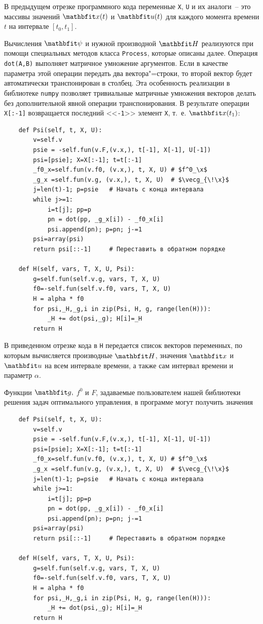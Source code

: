 \documentclass[a4paper,14pt, openany, twoside, draft]{extbook} %
\begin{document}
В предыдущем отрезке программного кода переменные \texttt{X}, \texttt{U} и их аналоги~-- это массивы значений $\vecx(t)$ и $\vecu(t)$ для каждого момента времени $t$ на интервале $[t_0,t_1]$.

Вычисления $\vecpsi$ и нужной производной $\vecH$ реализуются при помощи специальных методов класса \texttt{Process}, которые описаны далее.  Операция \texttt{dot(A,B)} выполняет матричное умножение аргументов.  Если в качестве параметра этой операции передать два вектора"=строки, то второй вектор будет автоматически транспонирован в столбец.  Эта особенность реализации в библиотеке \texttt{numpy} позволяет тривиальные матричные умножения векторов делать без дополнительной явной операции транспонирования.  В результате операции \texttt{X[:-1]} возвращается последний <<\texttt{-1}>> элемент \texttt{X}, т.~е. $\x(t_1)$:

\begin{verbatim}
    def Psi(self, t, X, U):
        v=self.v
        psie = -self.fun(v.F,(v.x,), t[-1], X[-1], U[-1])
        psi=[psie]; X=X[:-1]; t=t[:-1]
        _f0_x=self.fun(v.f0, (v.x,), t, X, U) # $f^0_\x$
        _g_x =self.fun(v.g, (v.x,), t, X, U)  # $\vecg_{\!\x}$
        j=len(t)-1; p=psie   # Начать с конца интервала
        while j>=1:
            i=t[j]; pp=p
            pn = dot(pp, _g_x[i]) - _f0_x[i]
            psi.append(pn); p=pn; j-=1
        psi=array(psi)
        return psi[::-1]     # Переставить в обратном порядке

    def H(self, vars, T, X, U, Psi):
        g=self.fun(self.v.g, vars, T, X, U)
        f0=-self.fun(self.v.f0, vars, T, X, U)
        H = alpha * f0
        for psi,_H,_g,i in zip(Psi, H, g, range(len(H))):
            _H += dot(psi,_g); H[i]=_H
        return H
\end{verbatim}

В приведенном отрезке кода в \texttt{H} передается список векторов переменных, по которым вычисляется производные $\vecH$, значения $\vecx$ и $\vecu$ на всем интервале времени, а также сам интервал времени и параметр $\alpha$.

Функции $\vecg,$ $f^0$ и $F$, задаваемые пользователем нашей библиотеки решения задач оптимального управления, в программе могут получить значения

\begin{verbatim}
    def Psi(self, t, X, U):
        v=self.v
        psie = -self.fun(v.F,(v.x,), t[-1], X[-1], U[-1])
        psi=[psie]; X=X[:-1]; t=t[:-1]
        _f0_x=self.fun(v.f0, (v.x,), t, X, U) # $f^0_\x$
        _g_x =self.fun(v.g, (v.x,), t, X, U)  # $\vecg_{\!\x}$
        j=len(t)-1; p=psie   # Начать с конца интервала
        while j>=1:
            i=t[j]; pp=p
            pn = dot(pp, _g_x[i]) - _f0_x[i]
            psi.append(pn); p=pn; j-=1
        psi=array(psi)
        return psi[::-1]     # Переставить в обратном порядке

    def H(self, vars, T, X, U, Psi):
        g=self.fun(self.v.g, vars, T, X, U)
        f0=-self.fun(self.v.f0, vars, T, X, U)
        H = alpha * f0
        for psi,_H,_g,i in zip(Psi, H, g, range(len(H))):
            _H += dot(psi,_g); H[i]=_H
        return H
\end{verbatim}
\end{document}
